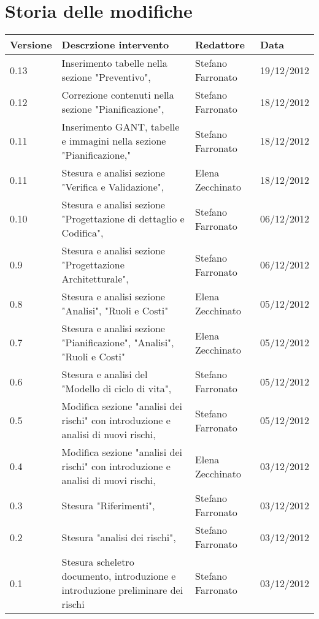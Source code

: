 \section*{Storia delle modifiche}
\begin{tabularx}{\textwidth}{lXll}
\toprule
Versione & Descrzione intervento & Redattore & Data\\
\midrule %
0.13 &Inserimento tabelle nella sezione "Preventivo", & Stefano Farronato & 19/12/2012\\
0.12 &Correzione contenuti nella sezione "Pianificazione", & Stefano Farronato & 18/12/2012\\
0.11 &Inserimento GANT, tabelle e immagini nella sezione "Pianificazione," & Stefano Farronato & 18/12/2012\\
0.11 &Stesura e analisi sezione "Verifica e Validazione", & Elena Zecchinato & 18/12/2012\\
0.10 &Stesura e analisi sezione "Progettazione di dettaglio e Codifica", & Stefano Farronato & 06/12/2012\\
0.9 &Stesura e analisi sezione "Progettazione Architetturale", & Stefano Farronato & 06/12/2012\\
0.8 &Stesura e analisi sezione "Analisi", "Ruoli e Costi" & Elena Zecchinato & 05/12/2012\\
0.7 &Stesura e analisi sezione "Pianificazione", "Analisi", "Ruoli e Costi" & Elena Zecchinato & 05/12/2012\\
0.6 &Stesura e analisi del "Modello di ciclo di vita", & Stefano Farronato & 05/12/2012\\
0.5 &Modifica sezione "analisi dei rischi" con introduzione e analisi di nuovi rischi, & Stefano Farronato & 05/12/2012\\
0.4 & Modifica sezione "analisi dei rischi" con introduzione e analisi di nuovi rischi, & Elena Zecchinato & 03/12/2012\\
0.3 & Stesura "Riferimenti", & Stefano Farronato & 03/12/2012\\
0.2 & Stesura "analisi dei rischi", & Stefano Farronato & 03/12/2012\\
0.1 & Stesura scheletro documento, introduzione e introduzione preliminare dei rischi & Stefano Farronato & 03/12/2012\\
\bottomrule
\end{tabularx}
\newpage



\setcounter{page}{1}
\pagestyle{normal}

